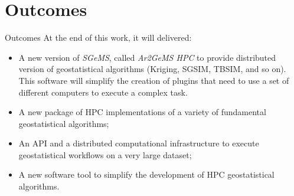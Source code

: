 \section{Outcomes}
\begin{frame}{Outcomes}
	At the end of this work, it will delivered:
    \begin{itemize}
        \item A new version of \textit{SGeMS}, called \textit{Ar2GeMS HPC} to provide distributed version of geostatistical algorithms (Kriging, SGSIM, TBSIM, and so on). This software will simplify the creation of plugins that need to use a set of different computers to execute a complex task.
    	\item A new package of HPC implementations of a variety of fundamental geostatistical algorithms;
        \item An API and a distributed computational infrastructure to execute geostatistical workflows on a very large dataset;
        \item A new software tool to simplify the development of HPC geostatistical algorithms. 
    \end{itemize}
\end{frame}




